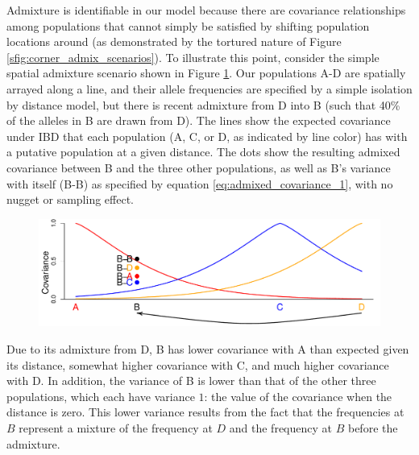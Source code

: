 \documentclass[12pt]{article}
\newcommand{\gb}[1]{{\it\color{magenta}{(#1)}}}
\begin{document}
Admixture is identifiable in our model because there are covariance relationships among populations that cannot simply be satisfied by shifting population locations around (as demonstrated by the tortured nature of Figure \ref{sfig:corner_admix_scenarios}). To illustrate this point, consider the simple spatial admixture scenario shown in Figure \ref{sfig:toy_admixture}. Our populations A-D are spatially arrayed  along a line, and their allele frequencies are specified by a simple isolation by distance model, but there is recent admixture from D into B (such that 40\% of the alleles in B are drawn from D). The lines show the expected covariance under IBD that each population (A, C, or D, as indicated by line color) has with a putative population at a given distance.  The dots show the resulting admixed covariance between B and the three other populations, as well as B's variance with itself (B-B) as specified by equation \eqref{eq:admixed_covariance_1}, with no nugget or sampling effect.

\begin{figure}[htp!]
	\centering
	\includegraphics[width=\textwidth]{figs/sims/Admix_covar_toy_fig.pdf}
	\caption{} \label{sfig:toy_admixture}
\end{figure}

Due to its admixture from D, B has lower covariance with A than expected given its distance, somewhat higher covariance with C, and much higher covariance with D. In addition, the variance of B is lower than that of the other three populations, which each have variance $1$: the value of the covariance when the distance is zero. This lower variance results from the fact that the frequencies at $B$ represent a mixture of the frequency at $D$ and the frequency at $B$ before the admixture. 
\end{document}
